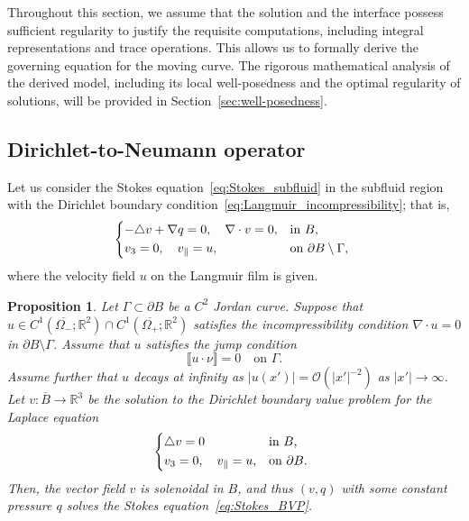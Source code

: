 \documentclass{article}
\newtheorem{proposition}[theorem]{Proposition}
\theoremstyle{remark}
\theoremstyle{definition}
\numberwithin{equation}{section}
\begin{document}
Throughout this section, we assume that the solution and the interface possess sufficient regularity to justify the requisite computations, including integral representations and trace operations. This allows us to formally derive the governing equation for the moving curve. The rigorous mathematical analysis of the derived model, including its local well-posedness and the optimal regularity of solutions, will be provided in Section~\ref{sec:well-posedness}.

\subsection{Dirichlet-to-Neumann operator}

Let us consider the Stokes equation~\eqref{eq:Stokes_subfluid} in the subfluid region with the Dirichlet boundary condition~\eqref{eq:Langmuir_incompressibility}; that is,
\begin{equation}
    \begin{dcases*}
        -\triangle v+\nabla q=0,\quad\nabla\cdot v=0, & in $B$,\\
        v_3=0,\quad v_\parallel=u, & on $\partial B\setminus\Gamma$,
    \end{dcases*}
    \label{eq:Stokes_BVP}
\end{equation}
where the velocity field $u$ on the Langmuir film is given.

\begin{proposition}
\label{prop:Laplace_solves_Stokes}
Let $\Gamma\subset\partial B$ be a $C^2$ Jordan curve. 
Suppose that $u \in C^1(\overline{\Omega_-};\mathbb{R}^2) \cap C^1(\overline{\Omega_+};\mathbb{R}^2)$ satisfies the incompressibility condition $\nabla\cdot u=0$ in $\partial B\setminus\Gamma$.
Assume that $u$ satisfies the jump condition
\[
    \llbracket u\cdot\nu \rrbracket = 0\quad\text{on }\Gamma.
\]
Assume further that $u$ decays at infinity as $|u(x')| = \mathcal{O}(|x'|^{-2})$ as $|x'|\to\infty$.
Let $v\colon\overline{B}\rightarrow\mathbb{R}^3$ be the solution to the Dirichlet boundary value problem for the Laplace equation
\begin{equation}
    \begin{dcases*}
        \triangle v=0 & in $B$,\\
        v_3=0,\quad v_\parallel=u,&on $\partial B$.
    \end{dcases*}
    \label{eq:DP}
\end{equation}
Then, the vector field $v$ is solenoidal in $B$, and thus $(v, q)$ with some constant pressure $q$ solves the Stokes equation~\eqref{eq:Stokes_BVP}.
\end{proposition}
\end{document}
